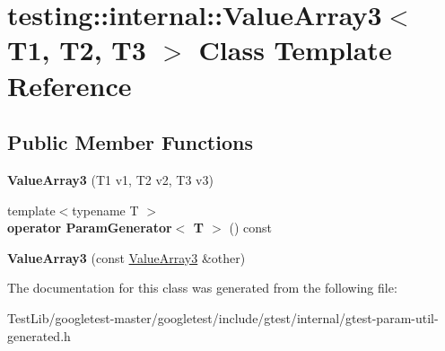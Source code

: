 \hypertarget{classtesting_1_1internal_1_1ValueArray3}{}\section{testing\+:\+:internal\+:\+:Value\+Array3$<$ T1, T2, T3 $>$ Class Template Reference}
\label{classtesting_1_1internal_1_1ValueArray3}
\subsection*{Public Member Functions}
\begin{DoxyCompactItemize}
\item 
\mbox{\label{classtesting_1_1internal_1_1ValueArray3_aa83b0671fed7a231ba127600c904246d}} 
{\bfseries Value\+Array3} (T1 v1, T2 v2, T3 v3)
\item 
\mbox{\label{classtesting_1_1internal_1_1ValueArray3_a4922d1cf7af801e82bdead15817b23fc}} 
{\footnotesize template$<$typename T $>$ }\\{\bfseries operator Param\+Generator$<$ T $>$} () const
\item 
\mbox{\label{classtesting_1_1internal_1_1ValueArray3_a742d8b00de6b63b020740ebbc7bc8d31}} 
{\bfseries Value\+Array3} (const \hyperlink{classtesting_1_1internal_1_1ValueArray3}{Value\+Array3} \&other)
\end{DoxyCompactItemize}


The documentation for this class was generated from the following file\+:\begin{DoxyCompactItemize}
\item 
Test\+Lib/googletest-\/master/googletest/include/gtest/internal/gtest-\/param-\/util-\/generated.\+h\end{DoxyCompactItemize}
